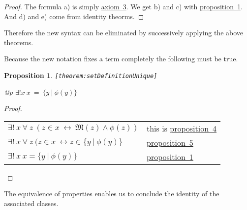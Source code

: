 \documentclass[a4paper,german,10pt,twoside]{book}
\newtheorem{prop}[thm]{Proposition}
\theoremstyle{definition}
\theoremstyle{remark}
\begin{document}
\begin{proof}
The formula a) is simply \hyperlink{axiom:classDefinition}{axiom~3}. We get b) and c) with \hyperlink{theorem:extensonalityEquivalence}{proposition~1}. And d) and e) come from identity theorms.
\end{proof}

Therefore the new syntax can be eliminated by successively applying the above theorems.


\par
Because the new notation fixes a term completely the following must be true.

\begin{prop}
\label{theorem:setDefinitionUnique} \hypertarget{theorem:setDefinitionUnique}{}
{\tt \tiny [\verb]theorem:setDefinitionUnique]]}
\mbox{}
\begin{longtable}{{@{\extracolsep{\fill}}p{\linewidth}}}
\centering $\exists! x\ x \ = \ \{ y \ | \ \phi(y) \} $
\end{longtable}

\end{prop}
\begin{proof}
\mbox{}
\par
\begin{tabularx}{\linewidth}{lX}
  $\exists! \ x \ \forall \ z \ ( z \in x \ \leftrightarrow \ \mathfrak{M}(z) \land \phi(z))$
    & this is \hyperlink{theorem:comprehension}{proposition~4} \\
  $\exists! \ x \ \forall \ z \ ( z \in x \ \leftrightarrow z \in \{ y \ | \  \phi(y) \}$
    & \hyperlink{theorem:setNotation}{proposition~5} \\
  $\exists! \ x \ x = \{ y \ | \  \phi(y) \}$
    & \hyperlink{theorem:extensonalityEquivalence}{proposition~1}
\end{tabularx}
\end{proof}


\par
The equivalence of properties enables us to conclude the identity of the associated classes.
\end{document}
